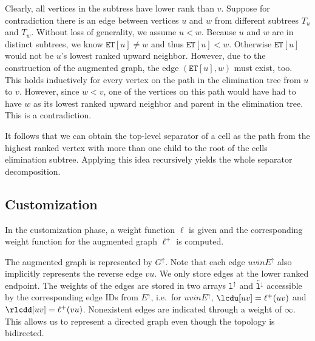 \documentclass[a4paper, english, cleveref]{lipics-v2021}
\newcommand*{\gchu}{G^{\uparrow}}
\newcommand*{\echu}{E^{\uparrow}}
\newcommand*{\lchu}{\mathtt{l}^{\uparrow}}
\newcommand*{\rlchd}{\overleftarrow{\mathtt{l}^{\downarrow}}}
\begin{document}
Clearly, all vertices in the subtress have lower rank than $v$.
Suppose for contradiction there is an edge between vertices $u$ and $w$ from different subtrees $T_u$ and $T_w$.
Without loss of generality, we assume $u < w$.
Because $u$ and $w$ are in distinct subtrees, we know $\mathtt{ET}[u] \neq w$ and thus $\mathtt{ET}[u] < w$.
Otherwise $\mathtt{ET}[u]$ would not be $u$'s lowest ranked upward neighbor.
However, due to the construction of the augmented graph, the edge $(\mathtt{ET}[u], w)$ must exist, too.
This holds inductively for every vertex on the path in the elimination tree from $u$ to $v$.
However, since $w < v$, one of the vertices on this path would have had to have $w$ as its lowest ranked upward neighbor and parent in the elimination tree.
This is a contradiction.

It follows that we can obtain the top-level separator of a cell as the path from the highest ranked vertex with more than one child to the root of the cells elimination subtree.
Applying this idea recursively yields the whole separator decomposition.


\subsection{Customization}


In the customization phase, a weight function $\ell$ is given and the corresponding weight function for the augmented graph $\ell^+$ is computed.

The augmented graph is represented by $\gchu$.
Note that each edge $uv in \echu$ also implicitly represents the reverse edge $vu$.
We only store edges at the lower ranked endpoint.
The weights of the edges are stored in two arrays $\lchu$ and $\rlchd$ accessible by the corresponding edge IDs from $\echu$, i.e.\ for $uv in \echu$, $\lcdu[uv] = \ell^+(uv)$ and $\rlcdd[uv] = \ell^+(vu)$.
Nonexistent edges are indicated through a weight of $\infty$.
This allows us to represent a directed graph even though the topology is bidirected.
\end{document}
